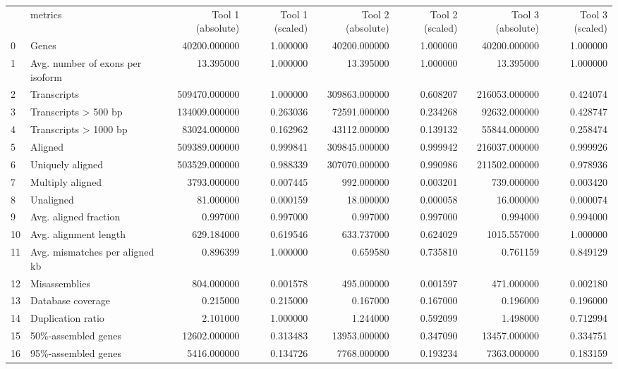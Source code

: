 \begin{tabular}{llrrrrrr}
 & metrics & Tool 1 (absolute) & Tool 1 (scaled) & Tool 2 (absolute) & Tool 2 (scaled) & Tool 3 (absolute) & Tool 3 (scaled) \\
0 & Genes & 40200.000000 & 1.000000 & 40200.000000 & 1.000000 & 40200.000000 & 1.000000 \\
1 & Avg. number of exons per isoform & 13.395000 & 1.000000 & 13.395000 & 1.000000 & 13.395000 & 1.000000 \\
2 & Transcripts & 509470.000000 & 1.000000 & 309863.000000 & 0.608207 & 216053.000000 & 0.424074 \\
3 & Transcripts > 500 bp & 134009.000000 & 0.263036 & 72591.000000 & 0.234268 & 92632.000000 & 0.428747 \\
4 & Transcripts > 1000 bp & 83024.000000 & 0.162962 & 43112.000000 & 0.139132 & 55844.000000 & 0.258474 \\
5 & Aligned & 509389.000000 & 0.999841 & 309845.000000 & 0.999942 & 216037.000000 & 0.999926 \\
6 & Uniquely aligned & 503529.000000 & 0.988339 & 307070.000000 & 0.990986 & 211502.000000 & 0.978936 \\
7 & Multiply aligned & 3793.000000 & 0.007445 & 992.000000 & 0.003201 & 739.000000 & 0.003420 \\
8 & Unaligned & 81.000000 & 0.000159 & 18.000000 & 0.000058 & 16.000000 & 0.000074 \\
9 & Avg. aligned fraction & 0.997000 & 0.997000 & 0.997000 & 0.997000 & 0.994000 & 0.994000 \\
10 & Avg. alignment length & 629.184000 & 0.619546 & 633.737000 & 0.624029 & 1015.557000 & 1.000000 \\
11 & Avg. mismatches per aligned kb & 0.896399 & 1.000000 & 0.659580 & 0.735810 & 0.761159 & 0.849129 \\
12 & Misassemblies & 804.000000 & 0.001578 & 495.000000 & 0.001597 & 471.000000 & 0.002180 \\
13 & Database coverage & 0.215000 & 0.215000 & 0.167000 & 0.167000 & 0.196000 & 0.196000 \\
14 & Duplication ratio & 2.101000 & 1.000000 & 1.244000 & 0.592099 & 1.498000 & 0.712994 \\
15 & 50\%-assembled genes & 12602.000000 & 0.313483 & 13953.000000 & 0.347090 & 13457.000000 & 0.334751 \\
16 & 95\%-assembled genes & 5416.000000 & 0.134726 & 7768.000000 & 0.193234 & 7363.000000 & 0.183159 \\

\end{tabular}
